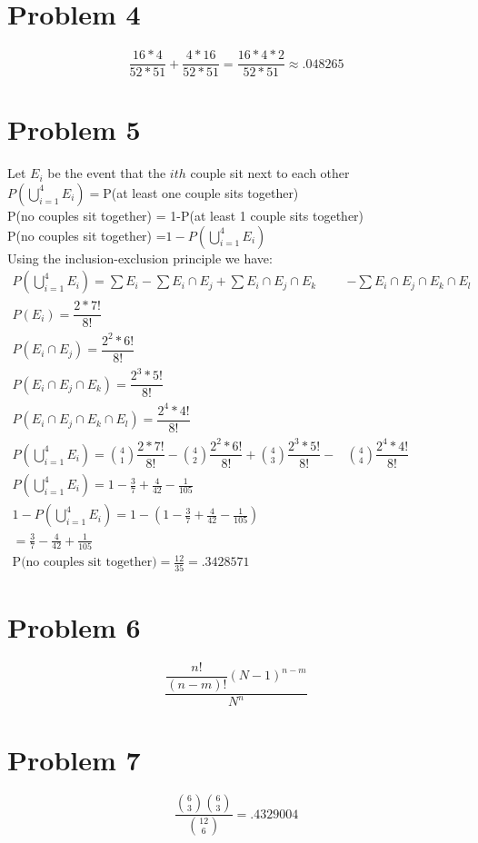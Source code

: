 \documentclass{article}
\begin{document}
\begin{flushleft}
\section*{Problem 4}
\[\dfrac{16*4}{52*51}+\dfrac{4*16}{52*51} = \dfrac{16*4*2}{52*51} \approx .048265
\]
\section*{Problem 5}
Let $E_i$ be the event that the $ith$ couple sit next to each other\\
$P\left(\bigcup_{i=1}^{4}E_i\right)=$P(at least one couple sits together)\\
P(no couples sit together) = 1-P(at least 1 couple sits together)\\
P(no couples sit together) =$1-P\left(\bigcup_{i=1}^{4}E_i\right)$\\
Using the inclusion-exclusion principle we have:
\begin{align*}
P\left(\bigcup_{i=1}^{4}E_i\right)= \sum E_i -\sum E_i \cap E_j +\sum E_i \cap E_j \cap E_k& -\sum E_i \cap E_j \cap E_k \cap E_l\\
P(E_i)=\dfrac{2*7!}{8!}&\\
P(E_i\cap E_j)=\dfrac{2^2*6!}{8!}&\\
P(E_i\cap E_j \cap E_k)=\dfrac{2^3*5!}{8!}&\\
P(E_i\cap E_j \cap E_k \cap E_l)=\dfrac{2^4*4!}{8!}&\\
P\left(\bigcup_{i=1}^{4}E_i\right)={4\choose 1}\dfrac{2*7!}{8!}-{4\choose 2}\dfrac{2^2*6!}{8!}+{4\choose 3}\dfrac{2^3*5!}{8!}-&{4 \choose 4}\dfrac{2^4*4!}{8!}\\
P\left(\bigcup_{i=1}^{4}E_i\right)=1-\frac{3}{7}+\frac{4}{42}-\frac{1}{105}&\\
1-P\left(\bigcup_{i=1}^{4}E_i\right)=1-\left(1-\frac{3}{7}+\frac{4}{42}-\frac{1}{105}\right)&\\
=\frac{3}{7}-\frac{4}{42}+\frac{1}{105}\\
\text{P(no couples sit together)}=\frac{12}{35} =.3428571&
\end{align*}
\section*{Problem 6}
\[\dfrac{\dfrac{n!}{(n-m)!}(N-1)^{n-m}}{N^n}
\]
\pagebreak
\section*{Problem 7}
\[\dfrac{{6\choose 3}{6\choose 3}}{{12\choose 6}}=.4329004
\]

\end{flushleft}
\end{document}
